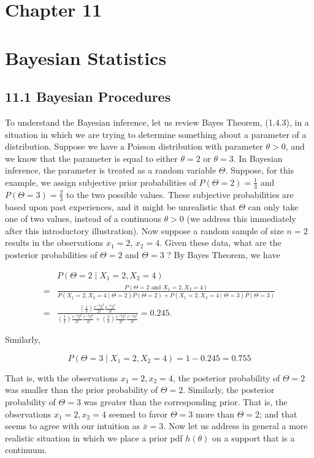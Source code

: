 \section*{Chapter 11}
\section*{Bayesian Statistics}
\subsection*{11.1 Bayesian Procedures}
To understand the Bayesian inference, let us review Bayes Theorem, (1.4.3), in a situation in which we are trying to determine something about a parameter of a distribution. Suppose we have a Poisson distribution with parameter $\theta>0$, and we know that the parameter is equal to either $\theta=2$ or $\theta=3$. In Bayesian inference, the parameter is treated as a random variable $\Theta$. Suppose, for this example, we assign subjective prior probabilities of $P(\Theta=2)=\frac{1}{3}$ and $P(\Theta=3)=\frac{2}{3}$ to the two possible values. These subjective probabilities are based upon past experiences, and it might be unrealistic that $\Theta$ can only take one of two values, instead of a continuous $\theta>0$ (we address this immediately after this introductory illustration). Now suppose a random sample of size $n=2$ results in the observations $x_{1}=2$, $x_{2}=4$. Given these data, what are the posterior probabilities of $\Theta=2$ and $\Theta=3$ ? By Bayes Theorem, we have

$$
\begin{aligned}
& P\left(\Theta=2 \mid X_{1}=2, X_{2}=4\right) \\
= & \frac{P\left(\Theta=2 \text { and } X_{1}=2, X_{2}=4\right)}{P\left(X_{1}=2, X_{2}=4 \mid \Theta=2\right) P(\Theta=2)+P\left(X_{1}=2, X_{2}=4 \mid \Theta=3\right) P(\Theta=3)} \\
= & \frac{\left(\frac{1}{3}\right) \frac{e^{-2} 2^{2}}{2!} \frac{e^{-2} 2^{4}}{4!}}{\left(\frac{1}{3}\right) \frac{e^{-2} 2^{2}}{2!} \frac{e^{-2} 2^{4}}{4!}+\left(\frac{2}{3}\right) \frac{e^{-3} 3^{2}}{2!} \frac{e^{-3} 3^{4}}{4!}}=0.245 .
\end{aligned}
$$

Similarly,

$$
P\left(\Theta=3 \mid X_{1}=2, X_{2}=4\right)=1-0.245=0.755
$$

That is, with the observations $x_{1}=2, x_{2}=4$, the posterior probability of $\Theta=2$ was smaller than the prior probability of $\Theta=2$. Similarly, the posterior probability of $\Theta=3$ was greater than the corresponding prior. That is, the observations $x_{1}=2, x_{2}=4$ seemed to favor $\Theta=3$ more than $\Theta=2$; and that seems to agree with our intuition as $\bar{x}=3$. Now let us address in general a more realistic situation in which we place a prior pdf $h(\theta)$ on a support that is a continuum.

